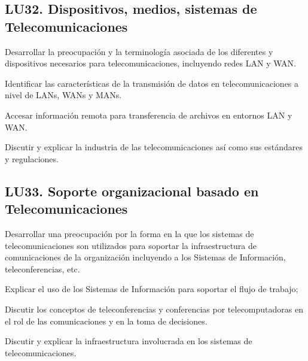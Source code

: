 \subsection{LU32. Dispositivos, medios, sistemas de Telecomunicaciones}\label{sec:LU32}
\begin{LearningUnit}
\begin{LUGoal}
\item Desarrollar la preocupación y la terminología asociada de los diferentes y dispositivos necesarios para telecomunicaciones, incluyendo redes LAN y WAN.
\end{LUGoal}

\begin{LUObjective}
\item Identificar las características de la transmisión de datos en telecomunicaciones a nivel de LANs, WANs y MANs.
\item Accesar información remota para transferencia de archivos en entornos LAN y WAN.
\item Discutir y explicar la industria de las telecomunicaciones así como sus estándares y regulaciones.
\end{LUObjective}
\end{LearningUnit}

\subsection{LU33. Soporte organizacional basado en Telecomunicaciones}\label{sec:LU33}
\begin{LearningUnit}
\begin{LUGoal}
\item Desarrollar una preocupación por la forma en la que los sistemas de telecomunicaciones son utilizados para soportar la infraestructura de comunicaciones de la organización incluyendo a los Sistemas de Información, teleconferencias, etc.
\end{LUGoal}

\begin{LUObjective}
\item Explicar el uso de los Sistemas de Información para soportar el flujo de trabajo;
\item Discutir los conceptos de teleconferencias y conferencias por telecomputadoras en el rol de las comunicaciones y en la toma de decisiones.
\item Discutir y explicar la infraestructura involucrada en los sistemas de telecomunicaciones.
\end{LUObjective}
\end{LearningUnit}


